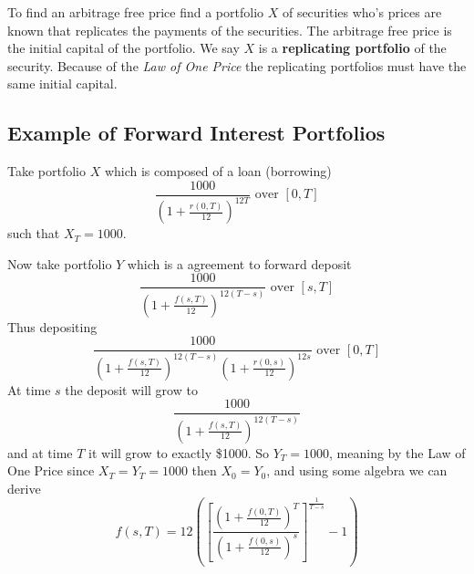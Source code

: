 \documentclass[12pt,letterpaper, twocolumn]{article}
\begin{document}
To find an arbitrage free price find a portfolio $X$ of securities who's prices are known that replicates the payments of the securities. The arbitrage free price is the initial capital of the portfolio. We say $X$ is a \textbf{replicating portfolio} of the security. Because of the \textit{Law of One Price} the replicating portfolios must have the same initial capital. 

\subsection*{Example of Forward Interest Portfolios}
Take portfolio $X$ which is composed of a loan (borrowing) 
\[ \frac{1000}{\left( 1+ \frac{r(0,T)}{12} \right)^{12T}} \text{ over } [0,T] \]
such that $X_T = 1000$. 

Now take portfolio $Y$ which is a agreement to forward deposit 
\[ \frac{1000}{\left( 1+ \frac{f(s,T)}{12} \right)^{12(T-s)}} \text{ over } [s,T] \]
Thus depositing 
\[ \frac{1000}{\left( 1+ \frac{f(s,T)}{12} \right)^{12(T-s)}\left( 1+ \frac{r(0,s)}{12} \right)^{12s}} \text{ over } [0,T] \]
At time $s$ the deposit will grow to
\[ \frac{1000}{\left( 1+ \frac{f(s,T)}{12} \right)^{12(T-s)}}\]
and at time $T$ it will grow to exactly \$1000. 
So $Y_T = 1000$, meaning by the Law of One Price since $X_T = Y_T=1000$ then $X_0 = Y_0$, and using some algebra we can derive
\[
    f(s,T) = 12{\left( \left[ \frac{(1+ \frac{f(0,T)}{12})^T}{(1+ \frac{f(0,s)}{12})^s} \right]^{\frac{1}{T-s}}-1 \right)}
\]
\end{document}
